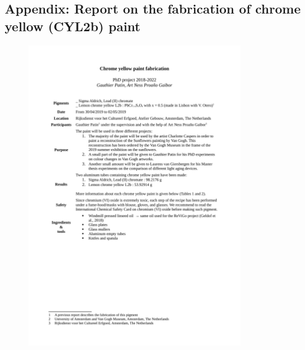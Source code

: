\begin{appendices}





\newpage
\section[\hspace{0.3cm}Report on the fabrication of chrome yellow (\acrshort{CYL2b}) paint]{ Appendix: Report on the fabrication of chrome yellow (\gls{CYL2b}) paint}
\label{app:ch4_making_CYL2b_paints}


\begin{figure}[!h]
\centering
\includegraphics[width=0.85\textwidth]{Appendices/2019-05-16_CY_Paint_Making_Report_p1.pdf}
\end{figure}






\end{appendices}
